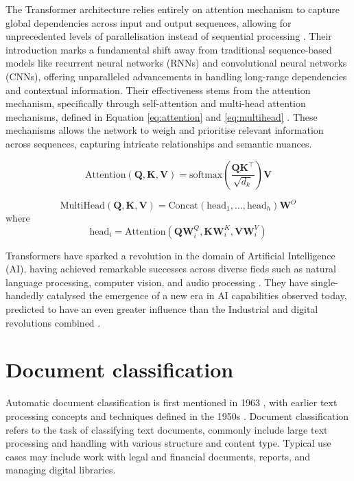 The Transformer architecture relies entirely on attention mechanism to capture global dependencies across input and output sequences, allowing for unprecedented levels of parallelisation instead of sequential processing \cite{vaswani-2023-attention}. Their introduction marks a fundamental shift away from traditional sequence-based models like recurrent neural networks (RNNs) and convolutional neural networks (CNNs), offering unparalleled advancements in handling long-range dependencies and contextual information. Their effectiveness stems from the attention mechanism, specifically through self-attention and multi-head attention mechanisms, defined in Equation \eqref{eq:attention} and \eqref{eq:multihead} \cite{vaswani-2023-attention}. These mechanisms allows the network to weigh and prioritise relevant information across sequences, capturing intricate relationships and semantic nuances.

\begin{equation}
    \label{eq:attention}
    \text{Attention}(\mathbf{Q}, \mathbf{K}, \mathbf{V}) = \text{softmax}\left( \frac{\mathbf{Q}\mathbf{K}^\top}{\sqrt{d_k}} \right) \mathbf{V}
\end{equation}

\begin{equation}
    \label{eq:multihead}
    \text{MultiHead}(\mathbf{Q}, \mathbf{K}, \mathbf{V}) = \text{Concat}(\text{head}_1, \ldots, \text{head}_h) \mathbf{W}^O
\end{equation}
where
\[
    \text{head}_i = \text{Attention}(\mathbf{Q} \mathbf{W}^Q_i, \mathbf{K} \mathbf{W}^K_i, \mathbf{V} \mathbf{W}^V_i)
\]

Transformers have sparked a revolution in the domain of Artificial Intelligence (AI), having achieved remarkable successes across diverse fieds such as natural language processing, computer vision, and audio processing \cite{lin-2022-survey-transformers}. They have single-handedly catalysed the emergence of a new era in AI capabilities observed today, predicted to have an even greater influence than the Industrial and digital revolutions combined \cite{makridakis-2017-ai-revolution}.


\section{Document classification}

Automatic document classification is first mentioned in 1963 \cite{borko-1963-auto-doc-classification}, with earlier text processing concepts and techniques defined in the 1950s \cite{luhn-1958-business-intelligence-system}. Document classification refers to the task of classifying text documents, commonly include large text processing and handling with various structure and content type. Typical use cases may include work with legal and financial documents, reports, and managing digital libraries.


